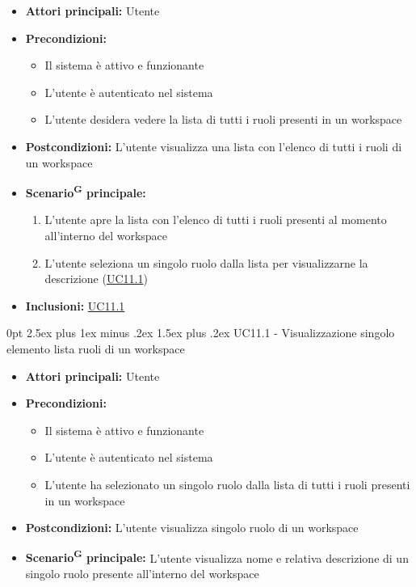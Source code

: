 \documentclass[a4paper, 11pt]{article}
\makeatletter
\renewcommand\paragraph{\@startsection{paragraph}{4}
  {0pt}
  {2.5ex plus 1ex minus .2ex}
  {1.5ex plus .2ex}
  {\normalfont\normalsize\bfseries\color{AccentDark}}}
\makeatother
\begin{document}
\begin{itemize}
	\item \textbf{Attori principali:} Utente
	\item \textbf{Precondizioni:} 
	\begin{itemize}
		\item Il sistema è attivo e funzionante
		\item L'utente è autenticato nel sistema
        \item L'utente desidera vedere la lista di tutti i ruoli presenti in un workspace
	\end{itemize}
    \item \textbf{Postcondizioni:} L'utente visualizza una lista con l'elenco di tutti i ruoli di un workspace
	\item \textbf{Scenario\textsuperscript{G} principale:}
	\begin{enumerate}
        \item L'utente apre la lista con l'elenco di tutti i ruoli presenti al momento all'interno del workspace
        \item L'utente seleziona un singolo ruolo dalla lista per visualizzarne la descrizione (\hyperref[UC11.1]{UC11.1})
	\end{enumerate}
    \item \textbf{Inclusioni:} \hyperref[UC11.1]{UC11.1}
\end{itemize}

\paragraph{UC11.1 - Visualizzazione singolo elemento lista ruoli di un workspace}\label{UC11.1}
\begin{itemize}
	\item \textbf{Attori principali:} Utente
	\item \textbf{Precondizioni:} 
	\begin{itemize}
		\item Il sistema è attivo e funzionante
		\item L'utente è autenticato nel sistema
        \item L'utente ha selezionato un singolo ruolo dalla lista di tutti i ruoli presenti in un workspace
	\end{itemize}
    \item \textbf{Postcondizioni:} L'utente visualizza singolo ruolo di un workspace
	\item \textbf{Scenario\textsuperscript{G} principale:} L'utente visualizza nome e relativa descrizione di un singolo ruolo presente all'interno del workspace	
\end{itemize}
\end{document}
